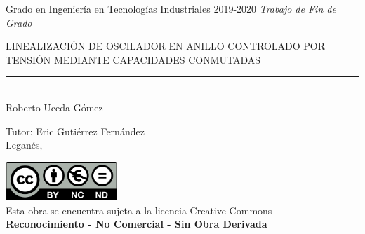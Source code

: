 \documentclass[12pt]{report} %
\begin{document}

\begin{titlepage}

	\begin{sffamily}
	\color{azulUC3M}
	\begin{center}
		\begin{figure}[H] %
		\end{figure}
		\vspace{2.5cm}
		\begin{Large}
			Grado en Ingeniería en Tecnologías Industriales		
			2019-2020
			\vspace{2cm}		
			\textsl{Trabajo de Fin de Grado}
			\bigskip
			
		\end{Large}
		 	{\Huge LINEALIZACIÓN DE OSCILADOR EN ANILLO CONTROLADO POR TENSIÓN MEDIANTE CAPACIDADES CONMUTADAS}\\
		 	\vspace*{0.5cm}
	 		\rule{10.5cm}{0.1mm}\\
			\vspace*{0.9cm}
			{\LARGE Roberto Uceda Gómez}\\ 
			\vspace*{1cm}
		\begin{Large}
			Tutor:
			Eric Gutiérrez Fernández \\
			Leganés, %
		\end{Large}
	\end{center}
	\vfill
	\color{black}
	\includegraphics[width=4.2cm]{res/creativecommons.png}\\ %
	Esta obra se encuentra sujeta a la licencia Creative Commons\\ \textbf{Reconocimiento - No Comercial - Sin Obra Derivada}
	\end{sffamily}
\end{titlepage}
\end{document}
